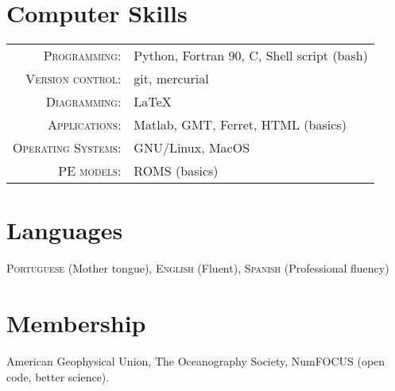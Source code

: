 \documentclass[pagestart=firstchapter]{article}
\begin{document}

\section*{Computer Skills}

\begin{tabular}{rl}
    \textsc{Programming}: & Python, Fortran 90, C, Shell script (bash)\\
    \textsc{Version control}: & git, mercurial\\
    \textsc{Diagramming}: & \LaTeX\\
    \textsc{Applications}: & Matlab, GMT, Ferret, \textsc{HTML} (basics)\\
    \textsc{Operating Systems}: & GNU/Linux, MacOS\\
    \textsc{PE models}: &ROMS (basics)    
\end{tabular}



\section*{Languages}

\textsc{Portuguese} (Mother tongue), \textsc{English} (Fluent), \textsc{Spanish} (Professional fluency)

\section*{Membership}

American Geophysical Union, The Oceanography Society, NumFOCUS (open code, better science).


%
%

\end{document}
